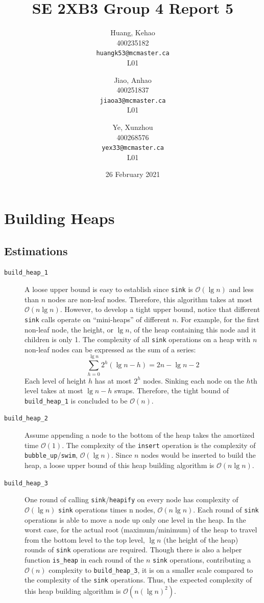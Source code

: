 \documentclass[titlepage, 12pt]{article}
\title{SE 2XB3 Group 4 Report 5}
\author{
  Huang, Kehao \\
  400235182 \\
  \texttt{huangk53@mcmaster.ca} \\
  L01
  \and
  Jiao, Anhao \\
  400251837 \\
  \texttt{jiaoa3@mcmaster.ca} \\
  L01
  \and
  Ye, Xunzhou \\
  400268576 \\
  \texttt{yex33@mcmaster.ca} \\
  L01
}
\date{26 February 2021}
\begin{document}
\maketitle{}

\newpage{}

\section{Building Heaps}
\label{sec:build}

\subsection{Estimations}
\label{sec:estimate}

\begin{description}
\item[\texttt{build\_heap\_1}] A loose upper bound is easy to establish since
  \texttt{sink} is \(\mathcal{O}(\lg{n})\) and less than \(n\) nodes are
  non-leaf nodes. Therefore, this algorithm takes at most
  \(\mathcal{O}(n\lg{n})\). However, to develop a tight upper bound, notice that
  different \texttt{sink} calls operate on ``mini-heaps'' of different \(n\).
  For example, for the first non-leaf node, the height, or \(\lg{n}\), of the
  heap containing this node and it children is only 1. The complexity of all
  \texttt{sink} operations on a heap with \(n\) non-leaf nodes can be expressed
  as the sum of a series:
  \begin{displaymath}
    \sum_{h = 0}^{\lg{n}} 2^h (\lg{n} - h) = 2n - \lg{n} - 2
  \end{displaymath}
  Each level of height \(h\) has at most \(2^h\) nodes. Sinking each node on the
  \(h\)th level takes at most \(\lg{n} - h\) swaps. Therefore, the tight bound
  of \texttt{build\_heap\_1} is concluded to be \(\mathcal{O}(n)\).
\item[\texttt{build\_heap\_2}] Assume appending a node to the bottom of the heap
  takes the amortized time \(\mathcal{O}(1)\). The complexity of the
  \texttt{insert} operation is the complexity of
  \texttt{bubble\_up}/\texttt{swim}, \(\mathcal{O}(\lg{n})\). Since \(n\) nodes
  would be inserted to build the heap, a loose upper bound of this heap building
  algorithm is \(\mathcal{O}(n\lg{n})\).
\item[\texttt{build\_heap\_3}] One round of calling
  \texttt{sink}/\texttt{heapify} on every node has complexity of
  \(\mathcal{O}(\lg{n})\) \texttt{sink} operations times n nodes,
  \(\mathcal{O}(n\lg{n})\). Each round of \texttt{sink} operations is able to
  move a node up only one level in the heap. In the worst case, for the actual
  root (maximum/minimum) of the heap to travel from the bottom level to the top
  level, \(\lg{n}\) (the height of the heap) rounds of \texttt{sink} operations
  are required. Though there is also a helper function \texttt{is\_heap} in each
  round of the \(n\) \texttt{sink} operations, contributing a \(\mathcal{O}(n)\)
  complexity to \texttt{build\_heap\_3}, it is on a smaller scale compared to
  the complexity of the \texttt{sink} operations. Thus, the expected complexity
  of this heap building algorithm is \(\mathcal{O}(n (\lg{n})^2)\).
\end{description}
\end{document}
